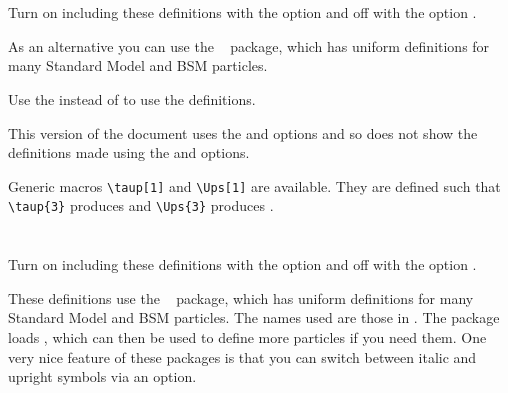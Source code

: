 \documentclass[REPORT=false, mhchem, USenglish]{atlasdoc}
\begin{document}
\maketitle

\tableofcontents



\twocolumn
\section{}

Turn on including these definitions with the option  and off with the option .

As an alternative you can use the ~\cite{hepparticles} package,
which has uniform definitions for many Standard Model and BSM particles.

Use the  instead of  to use the  definitions.

This version of the document uses the  and  options and so
does not show the definitions made using the  and  options.
%

Generic macros \verb|\taup[1]| and \verb|\Ups[1]| are available.
They are defined such that
\verb|\taup{3}| produces  and
\verb|\Ups{3}| produces .


\newpage
\section{}

Turn on including these definitions with the option  and off with the option .

These definitions use the ~\cite{hepparticles} package,
which has uniform definitions for many Standard Model and BSM particles.
The names used are those in .
The package loads , which can then be used to define more particles if you need them.
One very nice feature of these packages is that you can switch between italic and upright symbols via an option.
\end{document}
